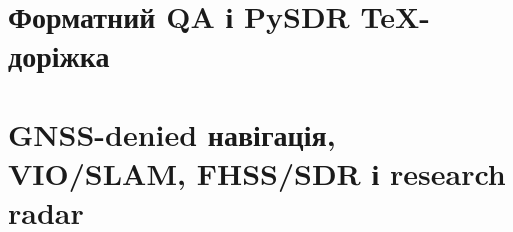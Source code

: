 \documentclass[11pt,a4paper,oneside]{book}
\begin{document}
\part{Форматний QA і PySDR TeX-доріжка}




\part{GNSS-denied навігація, VIO/SLAM, FHSS/SDR і research radar}








\appendix






\end{document}

